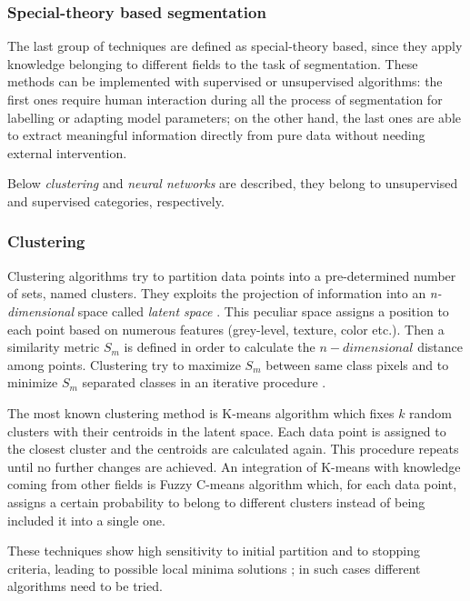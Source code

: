 \documentclass[../main.tex]{subfiles}
\begin{document}
\subsubsection{\large {Special-theory based segmentation}}

The last group of techniques are defined as special-theory based, since they apply knowledge belonging to different fields to the task of segmentation. 
These methods can be implemented with supervised or unsupervised algorithms: the first ones require human interaction during all the process of segmentation for labelling or adapting model parameters; on the other hand, the last ones are able to extract meaningful information directly from pure data without needing external intervention. 
 
Below \textit{clustering} and \textit{neural networks} are described, they belong to unsupervised and supervised categories, respectively.


\subsubsection{{Clustering}}

Clustering algorithms try to partition data points into a pre-determined number of sets, named clusters.
They exploits the projection of information into an \textit{n-dimensional} space called \textit{latent space} \cite{automated_segm_tech}. 
This peculiar space assigns a position to each point based on numerous features (grey-level, texture, color etc.). 
Then a similarity metric $S_{m}$ is defined in order to calculate the $n-dimensional$ distance among points.
Clustering try to maximize $S_{m}$ between same class pixels and to minimize $S_{m}$ separated classes in an iterative procedure \cite{clustering}.

The most known clustering method is K-means algorithm \cite{k-means} which fixes $k$ random clusters with their centroids in the latent space.
Each data point is assigned to the closest cluster and the centroids are calculated again. 
This procedure repeats until no further changes are achieved.
An integration of K-means with knowledge coming from other fields is Fuzzy C-means algorithm \cite{fuzzy-c-means} which, for each data point, assigns a certain probability to belong to different clusters instead of being included it into a single one.

These techniques show high sensitivity to initial partition and to stopping criteria, leading to possible local minima solutions \cite{automated_segm_tech}; in such cases different algorithms need to be tried.
\end{document}
